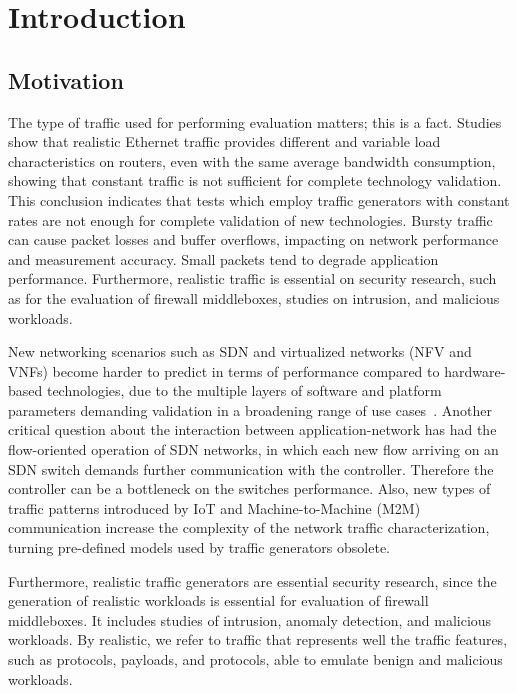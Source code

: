 \chapter{Introduction}\label{ch:introduction}

\section{Motivation}
 

The type of traffic used for performing evaluation matters; this is a fact. Studies show that realistic Ethernet traffic provides different and variable load characteristics on routers\cite{harpoon-validation}, even with the same average bandwidth consumption, showing that constant traffic is not sufficient for complete technology validation. This conclusion indicates that tests which employ traffic generators with constant rates are not enough for complete validation of new technologies. Bursty traffic can cause packet losses and buffer overflows, impacting on network performance and measurement accuracy\cite{burstiness-queue-lenght}. Small packets tend to degrade application performance\cite{comparative-trafficgen-tools}.  Furthermore, realistic traffic is essential on security research, such as for the evaluation of firewall middleboxes, studies on intrusion, and malicious workloads\cite{ditg-paper}. 

New networking scenarios such as \acrshort{SDN} and virtualized networks (\acrshort{NFV} and \acrshort{VNF}s) become harder to predict in terms of performance compared to hardware-based technologies, due to the multiple layers of software and platform parameters demanding validation in a broadening range of use cases~\cite{nfv-challenges}. Another critical question about the interaction between application-network has had the flow-oriented operation of SDN networks, in which each new flow arriving on an SDN switch demands further communication with the controller. Therefore the controller can be a bottleneck on the switches performance.  Also,  new types of traffic patterns introduced by \acrshort{IoT} and Machine-to-Machine (\acrshort{M2M}) communication\cite{machine2machine}  increase the complexity of the network traffic characterization, turning pre-defined models used by traffic generators obsolete. 

Furthermore, realistic traffic generators are essential security research, since the generation of realistic workloads is essential for evaluation of firewall middleboxes. It includes studies of intrusion, anomaly detection, and malicious workloads. By realistic, we refer to traffic that represents well the traffic features, such as protocols, payloads, and protocols, able to emulate benign and malicious workloads. 

